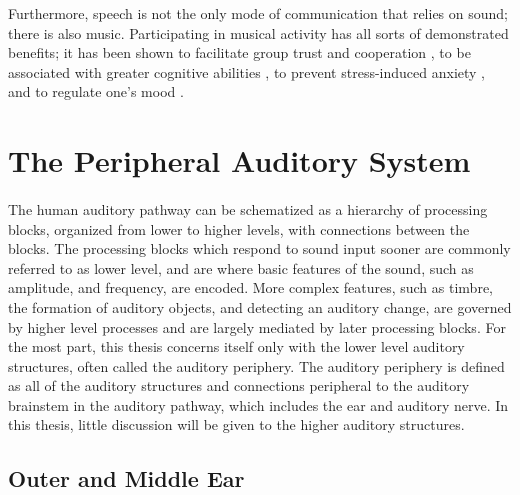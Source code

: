 Furthermore, speech is not the only mode of communication that relies on sound; there is also music.  Participating in musical activity has all sorts of demonstrated benefits; it has been shown to facilitate group trust and cooperation \cite{Anshel2004}, to be associated with greater cognitive abilities \cite{Schellenberg2004}, to prevent stress-induced anxiety \cite{Knight2001}, and to regulate one's mood \cite{Saarikallio2007}.

\section{The Peripheral Auditory System}
\paragraph{}The human auditory pathway can be schematized as a hierarchy of processing blocks, organized from lower to higher levels, with connections between the blocks.  The processing blocks which respond to sound input sooner are commonly referred to as lower level, and are where basic features of the sound, such as amplitude, and frequency, are encoded.  More complex features, such as timbre, the formation of auditory objects, and detecting an auditory change, are governed by higher level processes and are largely mediated by later processing blocks.  For the most part, this thesis concerns itself only with the lower level auditory structures, often called the auditory periphery.  The auditory periphery is defined as all of the auditory structures and connections peripheral to the auditory brainstem in the auditory pathway, which includes the ear and auditory nerve.  In this thesis, little discussion will be given to the higher auditory structures.

\subsection{Outer and Middle Ear}
